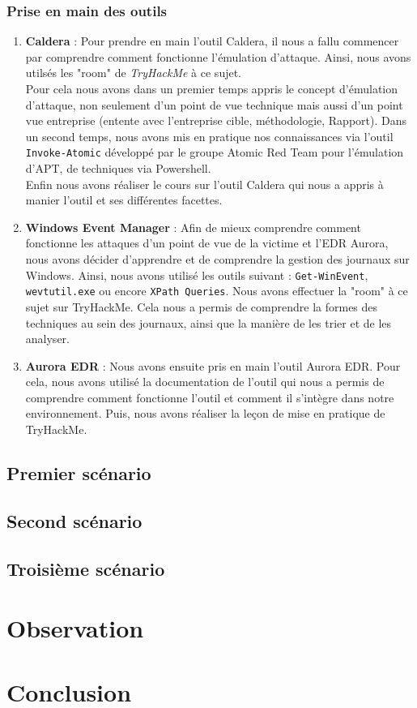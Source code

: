 \documentclass[12pt,letterpaper]{article}
\begin{document}
\subsubsection{Prise en main des outils}
\begin{enumerate}
    \item \textbf{Caldera} : 
    Pour prendre en main l'outil Caldera, il nous a fallu commencer par comprendre comment fonctionne l'émulation d'attaque. Ainsi, nous avons utilsés les "room" de \textit{TryHackMe} à ce sujet. \\

    Pour cela nous avons dans un premier temps appris le concept d'émulation d'attaque, non seulement d'un point de vue technique mais aussi d'un point vue entreprise (entente avec l'entreprise cible, méthodologie, Rapport). Dans un second temps, nous avons mis en pratique nos connaissances via l'outil \verb|Invoke-Atomic| développé par le groupe Atomic Red Team pour l'émulation d'APT, de techniques via Powershell. \\
    Enfin nous avons réaliser le cours sur l'outil Caldera qui nous a appris à manier l'outil et ses différentes facettes. 
    \item \textbf{Windows \- Event Manager} :
    Afin de mieux comprendre comment fonctionne les attaques d'un point de vue de la victime et l'EDR Aurora, nous avons décider d'apprendre et de comprendre la gestion des journaux sur Windows. Ainsi, nous avons utilisé les outils suivant : \verb|Get-WinEvent|, \verb|wevtutil.exe| ou encore \verb|XPath Queries|. Nous avons effectuer la "room" à ce sujet sur TryHackMe. Cela nous a permis de comprendre la formes des techniques au sein des journaux, ainsi que la manière de les trier et de les analyser. \\
    \item \textbf{Aurora EDR} :
    Nous avons ensuite pris en main l'outil Aurora EDR. Pour cela, nous avons utilisé la documentation de l'outil qui nous a permis de comprendre comment fonctionne l'outil et comment il s'intègre dans notre environnement. Puis, nous avons réaliser la leçon de mise en pratique de TryHackMe. \\
\end{enumerate}


\subsection{Premier scénario}
\subsection{Second scénario}
\subsection{Troisième scénario}
\section{Observation}
\section{Conclusion}



\newpage
\end{document}
